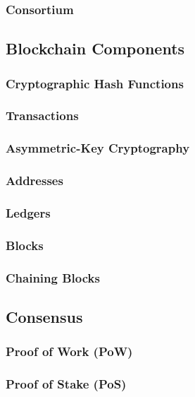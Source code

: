 \subsubsection{Consortium}

\subsection{Blockchain Components}

\subsubsection{Cryptographic Hash Functions}

\subsubsection{Transactions}

\subsubsection{Asymmetric-Key Cryptography}

\subsubsection{Addresses}

\subsubsection{Ledgers}

\subsubsection{Blocks}

\subsubsection{Chaining Blocks}

\subsection{Consensus}

\subsubsection{Proof of Work (PoW)}

\subsubsection{Proof of Stake (PoS)}

